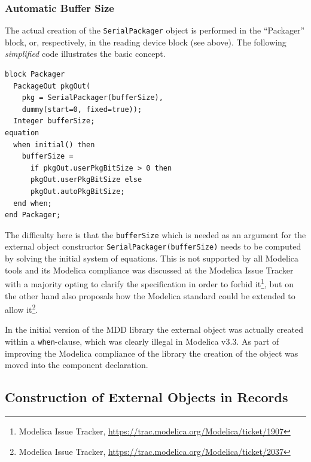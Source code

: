 \documentclass{resources/modelica}
\newcommand{\modelica}[1]{\lstinline[language=modelica]|#1|}
\begin{document}
\subsubsection{Automatic Buffer Size}

The actual creation of the \modelica{SerialPackager} object is performed in
the ``Packager'' block, or, respectively, in the reading device block (see
above). The following \emph{simplified} code illustrates the basic concept.
\begin{lstlisting}[language=modelica]
block Packager
  PackageOut pkgOut(
    pkg = SerialPackager(bufferSize),
    dummy(start=0, fixed=true));
  Integer bufferSize;
equation
  when initial() then
    bufferSize =
      if pkgOut.userPkgBitSize > 0 then
      pkgOut.userPkgBitSize else
      pkgOut.autoPkgBitSize;
  end when;
end Packager;
\end{lstlisting}
The difficulty here is that the \modelica{bufferSize} which is needed as an
argument for the external object constructor
\modelica{SerialPackager(bufferSize)} needs to be computed by solving the
initial system of equations. This is not supported by all Modelica tools and its
Modelica compliance was discussed at the Modelica Issue Tracker with a majority
opting to clarify the specification in order to forbid it\footnote{Modelica Issue Tracker,
\url{https://trac.modelica.org/Modelica/ticket/1907}}, but on the other hand
also proposals how the Modelica standard could be extended to allow
it\footnote{Modelica Issue Tracker,
\url{https://trac.modelica.org/Modelica/ticket/2037}}.

In the initial version of the MDD library the external object was actually
created within a \modelica{when}-clause,
which was clearly illegal in Modelica v3.3. As part of improving the Modelica
compliance of the library the creation of the object was moved into the
component declaration.

\subsection{Construction of External Objects in Records}
\end{document}
